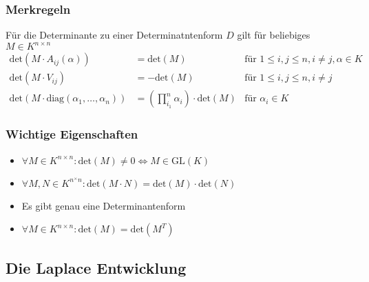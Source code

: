 \documentclass{kit}
\begin{document}
    \subsubsection{Merkregeln}
      \begin{center}
        Für die Determinante zu einer Determinatntenform $D$ gilt für beliebiges $M\in K^{n\times n}$
        $$\begin{aligned}
        \text{det}(M\cdot A_{ij}(\alpha)) & =\text{det}(M) &\text{für }1\le i,j\le n,i\neq j,\alpha\in K\\
        \text{det}(M\cdot V_{ij}) & = -\text{det}(M) & \text{für }1\le i,j\le n,i\neq j\\
        \text{det}(M\cdot\text{diag}(\alpha_1,\dots,\alpha_n)) & = (\prod_{i_1}^n\alpha_i)\cdot\text{det}(M) & \text{für }\alpha_i\in K
      \end{aligned}$$
      \end{center}
    \subsubsection{Wichtige Eigenschaften}
      \begin{itemize}
        \item $\forall M\in K^{n\times n}:\text{det}(M)\neq0\Leftrightarrow M\in\text{GL}(K)$
        \item $\forall M,N\in K^{n^\times n}:\text{det}(M\cdot N)=\text{det}(M)\cdot\text{det}(N)$
        \item Es gibt genau eine Determinantenform
        \item $\forall M\in K^{n\times n}:\text{det}(M)=\text{det}(M^T)$
      \end{itemize}
  \subsection{Die Laplace Entwicklung}
\end{document}
